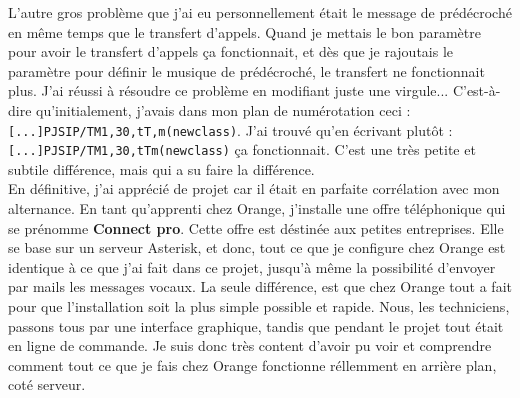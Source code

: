 \documentclass[12pt, a4paper]{article}
\begin{document}
L'autre gros problème que j'ai eu personnellement était le message de prédécroché
en même temps que le transfert d'appels. Quand je mettais le bon paramètre pour 
avoir le transfert d'appels ça fonctionnait, et dès que je rajoutais le 
paramètre pour définir le musique de prédécroché, le transfert ne fonctionnait
plus. J'ai réussi à résoudre ce problème en modifiant juste une virgule... 
C'est-à-dire qu'initialement, j'avais dans mon plan de numérotation ceci :\\
\texttt{[...]PJSIP/TM1,30,tT,m(newclass)}. J'ai trouvé qu'en écrivant
plutôt :\\ \texttt{[...]PJSIP/TM1,30,tTm(newclass)} ça fonctionnait.
C'est une très petite et subtile différence, mais qui a su faire la différence.\\

En définitive, j'ai apprécié de projet car il était en parfaite corrélation avec
mon alternance. En tant qu'apprenti chez Orange, j'installe une offre téléphonique
qui se prénomme \textbf{Connect pro}. Cette offre est déstinée aux petites entreprises.
Elle se base sur un serveur Asterisk, et donc, tout ce que je configure chez Orange
est identique à ce que j'ai fait dans ce projet, jusqu'à même la possibilité
d'envoyer par mails les messages vocaux. La seule différence, est que chez Orange
tout a fait pour que l'installation soit la plus simple possible et rapide. 
Nous, les techniciens, passons tous par une interface graphique, tandis que 
pendant le projet tout était en ligne de commande. Je suis donc très 
content d'avoir pu voir et comprendre comment tout ce que je fais chez Orange fonctionne
réllemment en arrière plan, coté serveur. 
\end{document}
